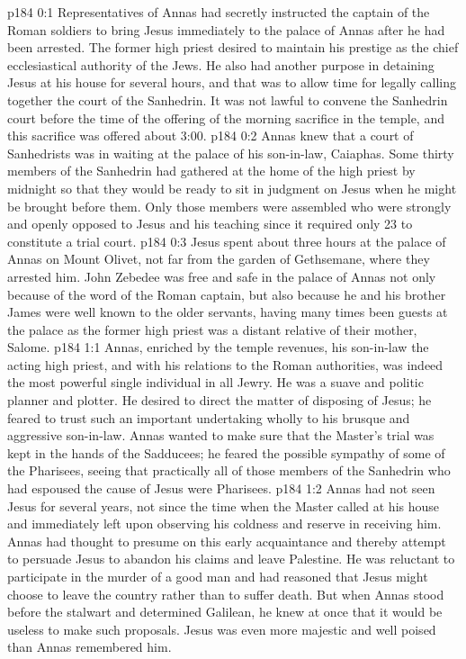 \author{Midwayer Commission}
\vs p184 0:1 Representatives of Annas had secretly instructed the captain of the Roman soldiers to bring Jesus immediately to the palace of Annas after he had been arrested. The former high priest desired to maintain his prestige as the chief ecclesiastical authority of the Jews. He also had another purpose in detaining Jesus at his house for several hours, and that was to allow time for legally calling together the court of the Sanhedrin. It was not lawful to convene the Sanhedrin court before the time of the offering of the morning sacrifice in the temple, and this sacrifice was offered about 3:00.
\vs p184 0:2 Annas knew that a court of Sanhedrists was in waiting at the palace of his son\hyp{}in\hyp{}law, Caiaphas. Some thirty members of the Sanhedrin had gathered at the home of the high priest by midnight so that they would be ready to sit in judgment on Jesus when he might be brought before them. Only those members were assembled who were strongly and openly opposed to Jesus and his teaching since it required only 23 to constitute a trial court.
\vs p184 0:3 Jesus spent about three hours at the palace of Annas on Mount Olivet, not far from the garden of Gethsemane, where they arrested him. John Zebedee was free and safe in the palace of Annas not only because of the word of the Roman captain, but also because he and his brother James were well known to the older servants, having many times been guests at the palace as the former high priest was a distant relative of their mother, Salome.
\vs p184 1:1 Annas, enriched by the temple revenues, his son\hyp{}in\hyp{}law the acting high priest, and with his relations to the Roman authorities, was indeed the most powerful single individual in all Jewry. He was a suave and politic planner and plotter. He desired to direct the matter of disposing of Jesus; he feared to trust such an important undertaking wholly to his brusque and aggressive son\hyp{}in\hyp{}law. Annas wanted to make sure that the Master’s trial was kept in the hands of the Sadducees; he feared the possible sympathy of some of the Pharisees, seeing that practically all of those members of the Sanhedrin who had espoused the cause of Jesus were Pharisees.
\vs p184 1:2 Annas had not seen Jesus for several years, not since the time when the Master called at his house and immediately left upon observing his coldness and reserve in receiving him. Annas had thought to presume on this early acquaintance and thereby attempt to persuade Jesus to abandon his claims and leave Palestine. He was reluctant to participate in the murder of a good man and had reasoned that Jesus might choose to leave the country rather than to suffer death. But when Annas stood before the stalwart and determined Galilean, he knew at once that it would be useless to make such proposals. Jesus was even more majestic and well poised than Annas remembered him.
